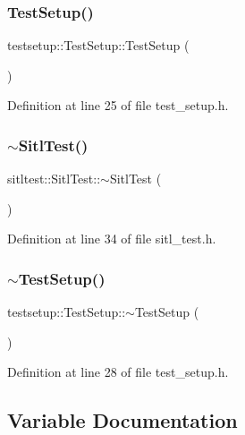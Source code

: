 \subsubsection{\texorpdfstring{TestSetup()}{TestSetup()}}
{\footnotesize\ttfamily testsetup\+::\+Test\+Setup\+::\+Test\+Setup (\begin{DoxyParamCaption}{ }\end{DoxyParamCaption})\hspace{0.3cm}{\ttfamily [inline]}}



Definition at line 25 of file test\+\_\+setup.\+h.

\mbox{\label{group__sitl__test_gae851257616c8079c36a14c48c49f1f9b}} 
\subsubsection{\texorpdfstring{$\sim$SitlTest()}{~SitlTest()}}
{\footnotesize\ttfamily sitltest\+::\+Sitl\+Test\+::$\sim$\+Sitl\+Test (\begin{DoxyParamCaption}{ }\end{DoxyParamCaption})\hspace{0.3cm}{\ttfamily [inline]}}



Definition at line 34 of file sitl\+\_\+test.\+h.

\mbox{\label{group__sitl__test_ga172d41e243ecb1ce863fdb203acc8070}} 
\subsubsection{\texorpdfstring{$\sim$TestSetup()}{~TestSetup()}}
{\footnotesize\ttfamily testsetup\+::\+Test\+Setup\+::$\sim$\+Test\+Setup (\begin{DoxyParamCaption}{ }\end{DoxyParamCaption})\hspace{0.3cm}{\ttfamily [inline]}}



Definition at line 28 of file test\+\_\+setup.\+h.



\subsection{Variable Documentation}
\mbox{\label{group__sitl__test_gab33b5c9c5ebfe96b53fd53b93ba4ae0e}} 
